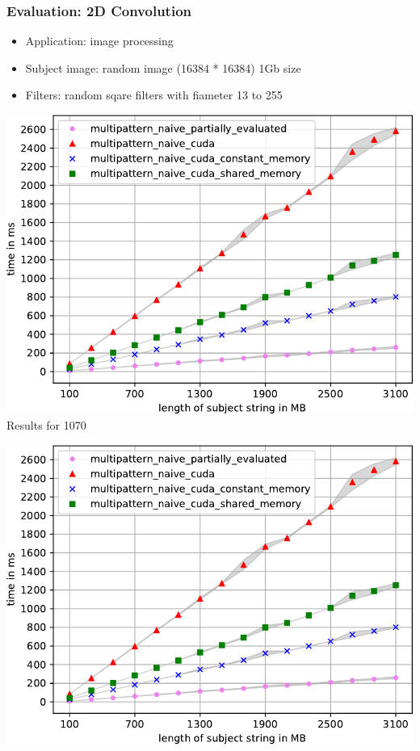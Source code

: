 \documentclass[xcolor=table]{beamer}
\begin{document}
\begin{frame}[fragile] \frametitle{Evaluation: 2D Convolution}
  \begin{itemize}
  \item Application: image processing
  \item Subject image: random image (16384 * 16384) 1Gb size
  \item Filters: random sqare filters with fiameter 13 to 255
  \end{itemize}
  \begin{center}
  \begin{minipage}[t]{0.48\textwidth}
    \begin{center}
  {\includegraphics[width=\textwidth]{pictures/Substr_1070_crop}}
  \\Results for 1070
\end{center}
\end{minipage}
\begin{minipage}[t]{0.48\textwidth}
{\includegraphics[width=\textwidth]{pictures/Substr_1070_crop}}
\end{minipage}
\end{center}
\end{frame}
\end{document}
